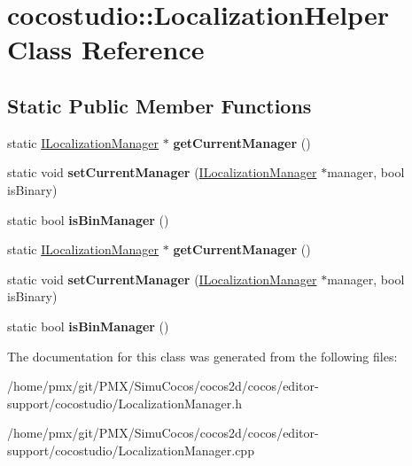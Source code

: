 \hypertarget{classcocostudio_1_1LocalizationHelper}{}\section{cocostudio\+:\+:Localization\+Helper Class Reference}
\label{classcocostudio_1_1LocalizationHelper}
\subsection*{Static Public Member Functions}
\begin{DoxyCompactItemize}
\item 
\mbox{\label{classcocostudio_1_1LocalizationHelper_aa05fb55256241bbda6cbd3db436060ac}} 
static \hyperlink{classcocostudio_1_1ILocalizationManager}{I\+Localization\+Manager} $\ast$ {\bfseries get\+Current\+Manager} ()
\item 
\mbox{\label{classcocostudio_1_1LocalizationHelper_a4f23532640ad723e00aef3cd06b0bc1f}} 
static void {\bfseries set\+Current\+Manager} (\hyperlink{classcocostudio_1_1ILocalizationManager}{I\+Localization\+Manager} $\ast$manager, bool is\+Binary)
\item 
\mbox{\label{classcocostudio_1_1LocalizationHelper_a0b4c60d9f7340b6849369faf65662b1c}} 
static bool {\bfseries is\+Bin\+Manager} ()
\item 
\mbox{\label{classcocostudio_1_1LocalizationHelper_adcaef334d6935eee6e93250526d266b1}} 
static \hyperlink{classcocostudio_1_1ILocalizationManager}{I\+Localization\+Manager} $\ast$ {\bfseries get\+Current\+Manager} ()
\item 
\mbox{\label{classcocostudio_1_1LocalizationHelper_a2bd7703d653d60d2af3578ce15c5d646}} 
static void {\bfseries set\+Current\+Manager} (\hyperlink{classcocostudio_1_1ILocalizationManager}{I\+Localization\+Manager} $\ast$manager, bool is\+Binary)
\item 
\mbox{\label{classcocostudio_1_1LocalizationHelper_a1cfa8150b5a53fd9fc57ffc7301a9b25}} 
static bool {\bfseries is\+Bin\+Manager} ()
\end{DoxyCompactItemize}


The documentation for this class was generated from the following files\+:\begin{DoxyCompactItemize}
\item 
/home/pmx/git/\+P\+M\+X/\+Simu\+Cocos/cocos2d/cocos/editor-\/support/cocostudio/Localization\+Manager.\+h\item 
/home/pmx/git/\+P\+M\+X/\+Simu\+Cocos/cocos2d/cocos/editor-\/support/cocostudio/Localization\+Manager.\+cpp\end{DoxyCompactItemize}

